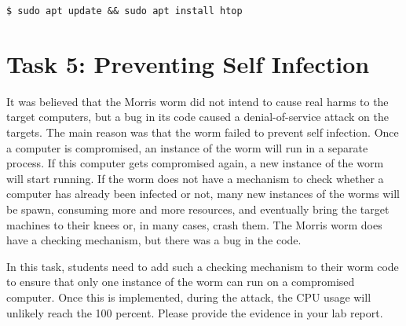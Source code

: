 \begin{lstlisting}
$ sudo apt update && sudo apt install htop
\end{lstlisting}
 



\section{Task 5: Preventing Self Infection} 

It was believed that the Morris worm did not intend to cause real harms to the 
target computers, but a bug in its code caused a 
denial-of-service attack on the targets. The main reason
was that the worm failed to prevent self infection. 
Once a computer is compromised, an instance of the worm
will run in a separate process. If this computer gets
compromised again, a new instance of the worm will 
start running. If the worm does not have a mechanism to 
check whether a computer has already been infected or not,
many new instances of the worms will be spawn, consuming
more and more resources, and eventually bring
the target machines to their knees or, in many cases, crash
them. The Morris worm does have a checking mechanism,
but there was a bug in the code. 


In this task, students need to add such a checking mechanism
to their worm code to ensure that only one instance 
of the worm can run on a compromised computer. 
Once this is implemented, during the attack, the
CPU usage will unlikely reach the 100 percent. 
Please provide the evidence in your lab report. 


 

\begin{comment}
\section{Task 6: Implementing a Kill Switch} 

Some worms have a kill switch, so the worm will stop
infecting others if the kill switch is turned on. 
This is a global switch, and it gives the attacker
a control over when to stop the attacks. 
The Morris worm did not have
such a kill switch, but recent worms do, such as
the WannaCry ransomware, which is technically a worm. 
The worm tries to connect to an unregistered web domain. 
If the connection fails, it'll proceed with the infection. 
If the connection succeeds, the program will stop the attack.

... 
\end{comment}



